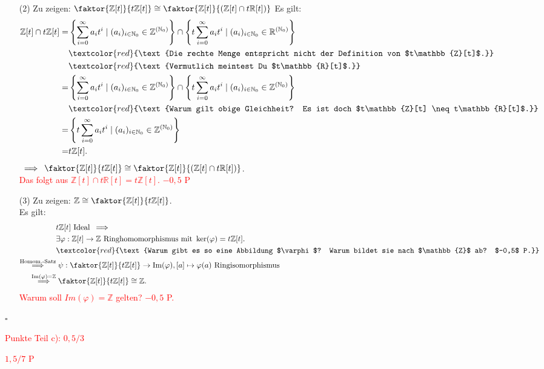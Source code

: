 \documentclass[12pt]{article}
\newcommand{\corr}[1]{\textcolor{red}{#1}}
\newcommand{\QED}{\begin{flushright} $\square$ \end{flushright}}
\newcommand{\df}{\enspace\Longrightarrow\enspace}
\begin{document}
\begin{enumerate}
\begin{enumerate}
		\item[(2)] Zu zeigen: $\faktor{\mathbb{Z}[t]}{t\mathbb{Z}[t]} \cong \faktor{\mathbb{Z}[t]}{(\mathbb{Z}[t] \cap t\mathbb{R}[t])}$
		Es gilt:
		\begin{align*}
			\mathbb{Z}[t]\cap t\mathbb{Z}[t] = &\left\lbrace\sum_{i=0}^{\infty}a_it^i \mid (a_i)_{i\in\mathbb{N}_0}\in\mathbb{Z}^{(\mathbb{N}_0)}\right\rbrace \cap \left\lbrace t\sum_{i=0}^{\infty}a_it^i \mid (a_i)_{i\in\mathbb{N}_0}\in\mathbb{R}^{(\mathbb{N}_0)}\right\rbrace \\
&\corr{\text{Die rechte Menge entspricht nicht der Definition von $t\mathbb{Z}[t]$.}}\\
&\corr{\text{Vermutlich meintest Du $t\mathbb{R}[t]$.}}\\
			= &\left\lbrace\sum_{i=0}^{\infty}a_it^i \mid (a_i)_{i\in\mathbb{N}_0}\in\mathbb{Z}^{(\mathbb{N}_0)}\right\rbrace \cap \left\lbrace t\sum_{i=0}^{\infty}a_it^i \mid (a_i)_{i\in\mathbb{N}_0}\in\mathbb{Z}^{(\mathbb{N}_0)}\right\rbrace \\
&\corr{\text{Warum gilt obige Gleichheit? Es ist doch $t\mathbb{Z}[t] \neq t\mathbb{R}[t]$.}}\\
			= &\left\lbrace t\sum_{i=0}^{\infty}a_it^i \mid (a_i)_{i\in\mathbb{N}_0}\in\mathbb{Z}^{(\mathbb{N}_0)}\right\rbrace \\
			= &t\mathbb{Z}[t].
		\end{align*}
		$\df \faktor{\mathbb{Z}[t]}{t\mathbb{Z}[t]} \cong \faktor{\mathbb{Z}[t]}{(\mathbb{Z}[t] \cap t\mathbb{R}[t])}$.\\
\corr{Das folgt aus $\mathbb{Z}[t] \cap t\mathbb{R}[t]=t\mathbb{Z}[t]$. $-0,5$ P}
		
		\item[(3)] Zu zeigen: $\mathbb{Z} \cong \faktor{\mathbb{Z}[t]}{t\mathbb{Z}[t]}$. \\
		Es gilt:
		\begin{align*}
			&t\mathbb{Z}[t]\text{ Ideal} \df \\
&\exists\varphi:\mathbb{Z}[t]\rightarrow\mathbb{Z}\text{ Ringhomomorphismus mit }\ker(\varphi)=t\mathbb{Z}[t]. \\
&\corr{\text{Warum gibt es so eine Abbildung $\varphi$? Warum bildet sie nach $\mathbb{Z}$ ab? $-0,5$ P.}}\\
			\overset{\text{Homom.-Satz}}{\df} &\;\psi:\faktor{\mathbb{Z}[t]}{t\mathbb{Z}[t]}\rightarrow\text{Im}(\varphi), [a]\mapsto\varphi(a)\text{ Ringisomorphismus} \\
			\overset{\text{Im}(\varphi)=\mathbb{Z}}{\df} &\;\faktor{\mathbb{Z}[t]}{t\mathbb{Z}[t]}\cong\mathbb{Z}.
		\end{align*}
\corr{Warum soll $Im(\varphi)=\mathbb{Z}$ gelten? $-0,5$ P.}
	\end{enumerate}
	\QED
\corr{Punkte Teil c): $0,5/3$}
\end{enumerate}
\corr{$1,5/7$ P}
\end{document}
